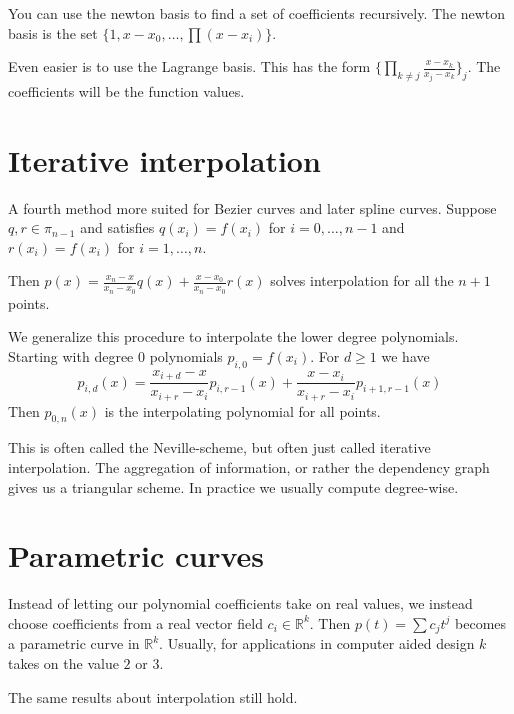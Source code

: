 You can use the newton basis to find a set of coefficients recursively.
The newton basis is the set $\{1, x - x_0, \ldots, \prod (x-x_i)\}$.

Even easier is to use the Lagrange basis. This has the form $\{\prod_{k\neq j} \frac {x - x_k}{x_j - x_k}\}_j$. The coefficients will be the function values.

\section{Iterative interpolation}

A fourth method more suited for Bezier curves and later spline curves.
Suppose $q,r\in \pi_{n - 1}$ and satisfies $q(x_i)=f(x_i)$ for $i=0,\ldots,n - 1$ and $r(x_i)=f(x_i)$ for $i=1,\ldots,n$.

Then $p(x)=\frac {x_n - x}{x_n - x_0}q(x) + \frac {x - x_0}{x_n - x_0}r(x)$ solves interpolation for all the $n + 1$ points.

We generalize this procedure to interpolate the lower degree polynomials.
Starting with degree $0$ polynomials $p_{i,0}=f(x_i)$.
For $d \geq 1$ we have 
\begin{equation*}
p_{i,d}(x) = \frac{x_{i + d} - x}{x_{i + r} - x_i}p_{i,r - 1}(x)
+ \frac{x - x_i}{x_{i +r} - x_i} p_{i + 1, r - 1}(x)
\end{equation*}
Then $p_{0, n}(x)$ is the interpolating polynomial for all points.

This is often called the Neville-scheme, but often just called iterative interpolation.
The aggregation of information, or rather the dependency graph gives us a triangular scheme.
In practice we usually compute degree-wise.

\section{Parametric curves}

Instead of letting our polynomial coefficients take on real values, we instead choose coefficients from a real vector field $c_i\in \mathbb R^k$.
Then $p(t) = \sum c_j t^j$ becomes a parametric curve in $\mathbb R^k$.
Usually, for applications in computer aided design $k$ takes on the value $2$ or $3$.

The same results about interpolation still hold.

